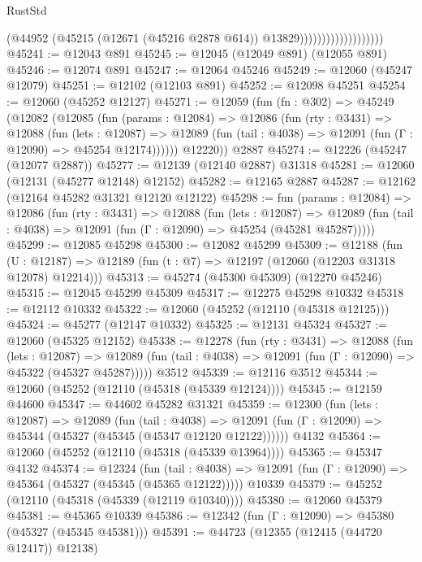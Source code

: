 \begin{lexlean}{RustStd}
\begin{coremodule}
                                      (@44952
                                        (@45215
                                          (@12671 (@45216 @2878 @614))
                                          @13829)))))))))))))))))))
@45241 := @12043 @891
@45245 := @12045 (@12049 @891) (@12055 @891)
@45246 := @12074 @891
@45247 := @12064 @45246
@45249 := @12060 (@45247 @12079)
@45251 := @12102 (@12103 @891)
@45252 := @12098 @45251
@45254 := @12060 (@45252 @12127)
@45271 := @12059
    (fun (fn : @302) =>
    @45249
      (@12082
        (@12085
          (fun (params : @12084) =>
          @12086
            (fun (rty : @3431) =>
            @12088
              (fun (lets : @12087) =>
              @12089 (fun (tail : @4038) => @12091 (fun (Γ : @12090) => @45254 @12174))))))
        @12220))
    @2887
@45274 := @12226 (@45247 (@12077 @2887))
@45277 := @12139 (@12140 @2887) @31318
@45281 := @12060 (@12131 (@45277 @12148) @12152)
@45282 := @12165 @2887
@45287 := @12162 (@12164 @45282 @31321 @12120 @12122)
@45298 := fun (params : @12084) =>
  @12086
    (fun (rty : @3431) =>
    @12088
      (fun (lets : @12087) =>
      @12089 (fun (tail : @4038) => @12091 (fun (Γ : @12090) => @45254 (@45281 @45287)))))
@45299 := @12085 @45298
@45300 := @12082 @45299
@45309 := @12188
    (fun (U : @12187) => @12189 (fun (t : @7) => @12197 (@12060 (@12203 @31318 @12078) @12214)))
@45313 := @45274 (@45300 @45309) (@12270 @45246)
@45315 := @12045 @45299 @45309
@45317 := @12275 @45298 @10332
@45318 := @12112 @10332
@45322 := @12060 (@45252 (@12110 (@45318 @12125)))
@45324 := @45277 (@12147 @10332)
@45325 := @12131 @45324
@45327 := @12060 (@45325 @12152)
@45338 := @12278
    (fun (rty : @3431) =>
    @12088
      (fun (lets : @12087) =>
      @12089 (fun (tail : @4038) => @12091 (fun (Γ : @12090) => @45322 (@45327 @45287)))))
    @3512
@45339 := @12116 @3512
@45344 := @12060 (@45252 (@12110 (@45318 (@45339 @12124))))
@45345 := @12159 @44600
@45347 := @44602 @45282 @31321
@45359 := @12300
    (fun (lets : @12087) =>
    @12089
      (fun (tail : @4038) =>
      @12091 (fun (Γ : @12090) => @45344 (@45327 (@45345 (@45347 @12120 @12122))))))
    @4132
@45364 := @12060 (@45252 (@12110 (@45318 (@45339 @13964))))
@45365 := @45347 @4132
@45374 := @12324
    (fun (tail : @4038) => @12091 (fun (Γ : @12090) => @45364 (@45327 (@45345 (@45365 @12122)))))
    @10339
@45379 := @45252 (@12110 (@45318 (@45339 (@12119 @10340))))
@45380 := @12060 @45379
@45381 := @45365 @10339
@45386 := @12342 (fun (Γ : @12090) => @45380 (@45327 (@45345 @45381)))
@45391 := @44723 (@12355 (@12415 (@44720 @12417)) @12138)

\end{coremodule}
\end{lexlean}
